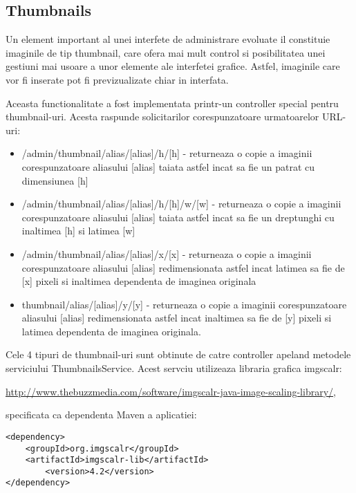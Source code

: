 \subsection{Thumbnails}
\label{thumbnails}

Un element important al unei interfete de administrare evoluate il constituie imaginile de tip thumbnail, care ofera mai mult control si posibilitatea unei gestiuni mai usoare a unor elemente ale interfetei grafice. Astfel, imaginile care vor fi inserate pot fi previzualizate chiar in interfata.

Aceasta functionalitate a fost implementata printr-un controller special pentru thumbnail-uri. Acesta raspunde solicitarilor corespunzatoare urmatoarelor URL-uri:

\begin{itemize}
\item{/admin/thumbnail/alias/[alias]/h/[h] - returneaza o copie a imaginii corespunzatoare aliasului [alias] taiata astfel incat sa fie un patrat cu dimensiunea [h]}

\item{/admin/thumbnail/alias/[alias]/h/[h]/w/[w] - returneaza o copie a imaginii corespunzatoare aliasului [alias] taiata astfel incat sa fie un dreptunghi cu inaltimea [h] si latimea [w]}

\item{/admin/thumbnail/alias/[alias]/x/[x] - returneaza o copie a imaginii corespunzatoare aliasului [alias] redimensionata astfel incat latimea sa fie de [x] pixeli si inaltimea dependenta de imaginea originala}

\item{thumbnail/alias/[alias]/y/[y] - returneaza o copie a imaginii corespunzatoare aliasului [alias] redimensionata astfel incat inaltimea sa fie de [y] pixeli si latimea dependenta de imaginea originala.}

\end{itemize}

Cele 4 tipuri de thumbnail-uri sunt obtinute de catre controller apeland metodele serviciului ThumbnailsService. Acest servciu utilizeaza libraria grafica imgscalr:

\url{http://www.thebuzzmedia.com/software/imgscalr-java-image-scaling-library/}, 

specificata ca dependenta Maven a aplicatiei:

\begin{lstlisting}[breaklines=true]
<dependency>
	<groupId>org.imgscalr</groupId>
	<artifactId>imgscalr-lib</artifactId>
    	<version>4.2</version> 
</dependency> 
\end{lstlisting}	

